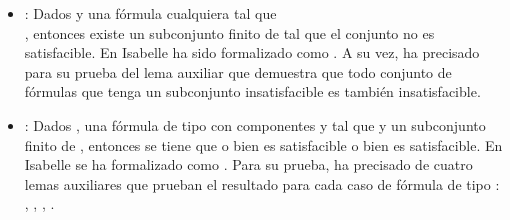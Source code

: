 \begin{isabellebody}
\begin{isamarkuptext}
\begin{itemize}
\begin{itemize}
      \item {}: Dados  y  una fórmula cualquiera tal que\\ , 
      entonces existe un subconjunto finito  de  tal que el conjunto  no es 
      satisfacible. En Isabelle ha sido formalizado como . A su vez, ha precisado
      para su prueba del lema auxiliar  que demuestra que todo conjunto de 
      fórmulas que tenga un subconjunto insatisfacible es también insatisfacible.
      \item {}: Dados ,  una fórmula de tipo \isa{{\isasymbeta}} con componentes  y  
      tal que  y  un subconjunto finito de , entonces se tiene que o bien 
       es satisfacible o bien  es satisfacible. En Isabelle se ha
      formalizado como . Para su prueba, ha precisado de cuatro lemas
      auxiliares que prueban el resultado para cada caso de fórmula de tipo \isa{{\isasymbeta}}: 
      , , ,
      .
    \end{itemize}
  \end{itemize}


\end{isamarkuptext}
\end{isabellebody}
